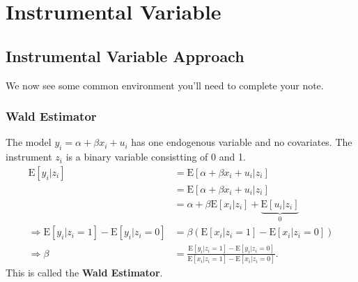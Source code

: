 \chapter{Instrumental Variable}


\section{Instrumental Variable Approach}

We now see some common environment you'll need to complete your note.

\subsection*{Wald Estimator}
The model \( y_i = \alpha + \beta x_i + u_i \) has one endogenous variable and no covariates.
The instrument \( z_i \) is a binary variable consistting of 0 and 1.
\begin{align*}
    \mathrm{E}[y_i | z_i ] &= \mathrm{E}[ \alpha + \beta x_i + u_i | z_i ] \\
    &= \mathrm{E}[ \alpha + \beta x_i + u_i | z_i ] \\
    &= \alpha + \beta \mathrm{E}[ x_i | z_i ] + \underbrace{\mathrm{E}[ u_i | z_i ]}_{0} \\ 
    \Rightarrow \mathrm{E}[y_i | z_i = 1] - \mathrm{E}[y_i | z_i = 0] &= \beta \left( \mathrm{E}[ x_i | z_i = 1] - \mathrm{E}[ x_i | z_i = 0] \right) \\
    \Rightarrow \beta &= \frac{\mathrm{E}[y_i | z_i = 1] - \mathrm{E}[y_i | z_i = 0]}{\mathrm{E}[ x_i | z_i = 1] - \mathrm{E}[ x_i | z_i = 0]}.
\end{align*}
This is called the \textbf{Wald Estimator}.

